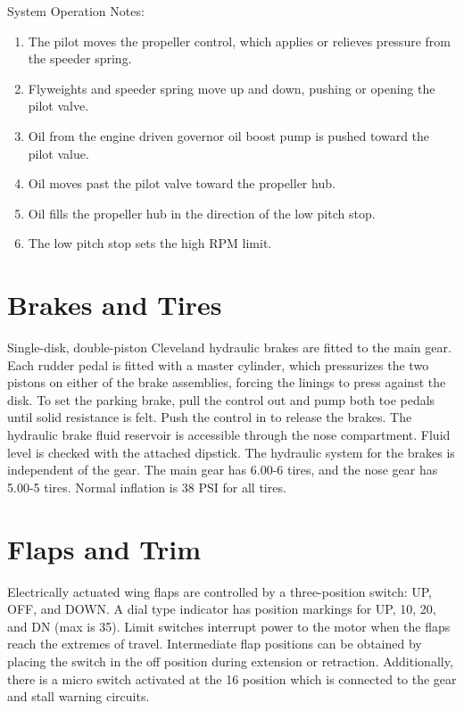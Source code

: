 System Operation Notes:
\begin{enumerate}
\item The pilot moves the propeller control, which applies or relieves pressure from the speeder spring.
\item Flyweights and speeder spring move up and down, pushing or opening the pilot valve.
\item Oil from the engine driven governor oil boost pump is pushed toward the pilot value.
\item Oil moves past the pilot valve toward the propeller hub.
\item Oil fills the propeller hub in the direction of the low pitch stop.
\item The low pitch stop sets the high RPM limit.
\end{enumerate}

\section{Brakes and Tires}

Single-disk, double-piston Cleveland hydraulic brakes are fitted to the main gear. Each rudder pedal is fitted with a
master cylinder, which pressurizes the two pistons on either of the brake assemblies, forcing the linings to press
against the disk. To set the parking brake, pull the control out and pump both toe pedals until solid resistance is felt.
Push the control in to release the brakes. The hydraulic brake fluid reservoir is accessible through the nose
compartment. Fluid level is checked with the attached dipstick. The hydraulic system for the brakes is independent
of the gear. The main gear has 6.00-6 tires, and the nose gear has 5.00-5 tires. Normal inflation is 38 PSI for all
tires.

\section{Flaps and Trim}

Electrically actuated wing flaps are controlled by a three-position switch: UP, OFF, and DOWN. A dial type
indicator has position markings for UP, 10, 20, and DN (max is 35\degree{}). Limit switches interrupt power to the motor
when the flaps reach the extremes of travel. Intermediate flap positions can be obtained by placing the switch in the
off position during extension or retraction. Additionally, there is a micro switch activated at the 16\degree{} position which
is connected to the gear and stall warning circuits.

